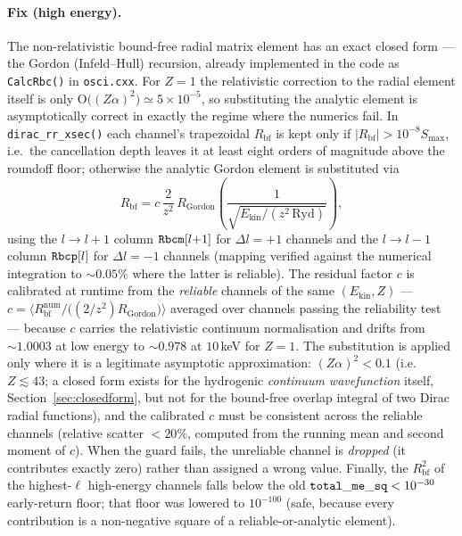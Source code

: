 \documentclass[11pt,a4paper]{article}
\newcommand{\Ryd}{\mathrm{Ryd}}
\begin{document}
\paragraph{Fix (high energy).} The non-relativistic bound-free radial
matrix element has an exact closed form --- the Gordon
(Infeld--Hull) recursion, already implemented in the code as
{\tt CalcRbc()} in {\tt osci.cxx}.  For $Z=1$ the relativistic
correction to the radial element itself is only
$\mathrm{O}\bigl((Z\alpha)^{2}\bigr)\simeq5\times10^{-5}$, so
substituting the analytic element is asymptotically correct in exactly
the regime where the numerics fail.  In {\tt dirac\_rr\_xsec()} each
channel's trapezoidal $R_{\mathrm{bf}}$ is kept only if
$|R_{\mathrm{bf}}|>10^{-8}S_{\max}$, i.e.\ the cancellation depth leaves
it at least eight orders of magnitude above the roundoff floor;
otherwise the analytic Gordon element is substituted via
\begin{equation}
  R_{\mathrm{bf}} = c\,\frac{2}{z^{2}}\,
    R_{\mathrm{Gordon}}\!\left(\frac{1}{\sqrt{E_{\mathrm{kin}}/(z^{2}\,\Ryd)}}\right),
\end{equation}
using the $l\to l+1$ column ${\tt Rbcm}[l{+}1]$ for $\Delta l=+1$
channels and the $l\to l-1$ column ${\tt Rbcp}[l]$ for $\Delta l=-1$
channels (mapping verified against the numerical integration to
$\sim0.05\%$ where the latter is reliable).  The residual factor $c$ is
calibrated at runtime from the \emph{reliable} channels of the same
$(E_{\mathrm{kin}},Z)$ --- $c=\bigl\langle
R_{\mathrm{bf}}^{\mathrm{num}}\big/\bigl((2/z^{2})R_{\mathrm{Gordon}}
\bigr)\bigr\rangle$ averaged over channels passing the reliability test
--- because $c$ carries the relativistic continuum normalisation and
drifts from $\sim1.0003$ at low energy to $\sim0.978$ at $10$\,keV for
$Z=1$.  The substitution is applied only where it is a legitimate
asymptotic approximation: $(Z\alpha)^{2}<0.1$ (i.e.\ $Z\lesssim43$; a closed
form exists for the hydrogenic \emph{continuum wavefunction} itself,
Section~\ref{sec:closedform}, but not for the bound-free overlap integral of
two Dirac radial functions), and the calibrated $c$ must be consistent
across the reliable channels
(relative scatter $<20\%$, computed from the running mean and second
moment of $c$).  When the guard fails, the unreliable channel is
\emph{dropped} (it contributes exactly zero) rather than assigned a
wrong value.  Finally, the $R_{\mathrm{bf}}^{2}$ of the highest-$\ell$
high-energy channels falls below the old
${\tt total\_me\_sq}<10^{-30}$ early-return floor; that floor was
lowered to $10^{-100}$ (safe, because every contribution is a
non-negative square of a reliable-or-analytic element).
\end{document}
